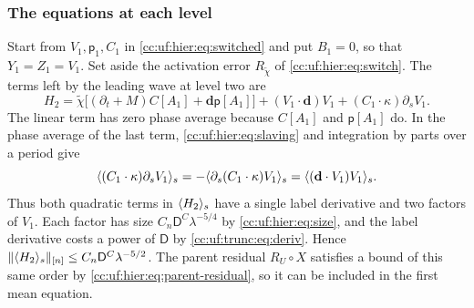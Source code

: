 \subsubsection{The equations at each level}

Start from $V_1,\mathsf p_1,C_1$ in
\eqref{cc:uf:hier:eq:switched} and put $B_1=0$, so that $Y_1=Z_1=V_1$.
Set aside the activation error $R_{\widetilde\chi}$ of
\eqref{cc:uf:hier:eq:switch}. The terms left by the leading wave at level
two are
\begin{equation}\label{cc:uf:hier:eq:H2}
 H_2=\widetilde\chi\bigl[(\partial_t+M)C[A_1]+\mathbf d\mathsf p[A_1]\bigr]
   +(V_1\cdot\mathbf d)V_1+(C_1\cdot\kappa)\partial_sV_1 .
\end{equation}
The linear term has zero phase average because $C[A_1]$ and
$\mathsf p[A_1]$ do. In the phase average of the last term,
\eqref{cc:uf:hier:eq:slaving} and integration by parts over a period give
\[
 \langle (C_1\cdot\kappa)\partial_sV_1\rangle_s
 =-\langle \partial_s(C_1\cdot\kappa)V_1\rangle_s
 =\langle (\mathbf d\cdot V_1)V_1\rangle_s.
\]
Thus both quadratic terms in $\langle H_2\rangle_s$ have a single label
derivative and two factors of $V_1$. Each factor has size
$C_n\mathsf D^C\lambda^{-5/4}$ by \eqref{cc:uf:hier:eq:size}, and the
label derivative costs a power of $\mathsf D$ by \eqref{cc:uf:trunc:eq:deriv}.
Hence $\|\langle H_2\rangle_s\|_{[n]}\le C_n\mathsf D^C\lambda^{-5/2}$.
The parent residual $R_U\circ X$ satisfies a bound of this same order by
\eqref{cc:uf:hier:eq:parent-residual}, so it can be included in the
first mean equation.

